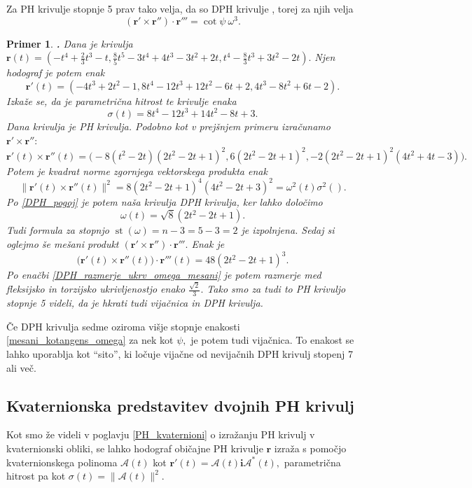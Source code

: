 \documentclass[12pt,a4paper,twoside]{article}
\theoremstyle{definition} %
\theoremstyle{plain} %
\theoremstyle{primerstyle}
\newtheorem{primer}[definicija]{Primer}
\numberwithin{equation}{section}  %
\newcommand{\rV}{\mathbf{r}}
\newcommand{\iV}{\mathbf{i}}
\newcommand{\AQ}{\mathcal{A}}
\DeclareMathOperator{\st}{st}
\begin{document}
Za PH krivulje stopnje 5 prav tako velja, da so DPH krivulje \cite[Izrek 1]{beltranmonterde}, torej za njih velja 
\begin{equation}
	\label{mesani_kotangens_omega}
	(\rV'\times\rV'')\cdot\rV'''=\cot\psi\ \omega^3.
\end{equation}
\begin{primer}
	\textbf{.} Dana je krivulja $\rV(t)=(-t^4+\frac{2}{3}t^3-t,\frac{8}{5}t^5-3t^4+4t^3-3t^2+2t,t^4-\frac{8}{3}t^3+3t^2-2t).$ Njen hodograf je potem enak $$\rV'(t)=(-4t^3+2t^2-1,8t^4-12t^3+12t^2-6 t+2,4t^3-8t^2+6 t-2).$$ Izkaže se, da je parametrična hitrost te krivulje enaka
	$$\sigma(t)=8t^4-12t^3+14t^2-8t+3.$$
	Dana krivulja je PH krivulja. Podobno kot v prejšnjem primeru izračunamo $\rV'\times\rV'':$
	$$\rV'(t)\times\rV''(t)=\big(-8(t^2-2t)(2t^2-2t+1)^2,6(2t^2-2t+1)^2,-2(2t^2-2t+1)^2(4t^2+4t-3)\big).$$
	Potem je kvadrat norme zgornjega vektorskega produkta enak
	$$\lVert\rV'(t)\times\rV''(t)\rVert^2=8(2t^2-2t+1)^4(4t^2-2t+3)^2=\omega^2(t)\sigma^2().$$
	Po \eqref{DPH_pogoj} je potem naša krivulja DPH krivulja, ker lahko določimo $$\omega(t)=\sqrt{8}(2t^2-2t+1).$$ Tudi formula za stopnjo $\st(\omega)=n-3=5-3=2$ je izpolnjena. Sedaj si oglejmo še mešani produkt $(\rV'\times\rV'')\cdot\rV'''.$ Enak je
	$$\big(\rV'(t)\times\rV''(t)\big)\cdot\rV'''(t)=48(2t^2-2t+1)^3.$$
	Po enačbi \eqref{DPH_razmerje_ukrv_omega_mesani} je potem razmerje med fleksijsko in torzijsko ukrivljenostjo enako $\frac{\sqrt{2}}{3}.$ Tako smo za tudi to PH krivuljo stopnje 5 videli, da je hkrati tudi vijačnica in DPH krivulja.
\end{primer}

Če DPH krivulja sedme oziroma višje stopnje enakosti \eqref{mesani_kotangens_omega} za nek kot $\psi,$ je potem tudi vijačnica. To enakost se lahko uporablja kot ``sito'', ki ločuje vijačne od nevijačnih DPH krivulj stopenj 7 ali več.

\subsection{Kvaternionska predstavitev dvojnih PH krivulj}

Kot smo že videli v poglavju \ref{PH_kvaternioni} o izražanju PH krivulj v kvaternionski obliki, se lahko hodograf običajne PH krivulje $\rV$ izraža s pomočjo kvaternionskega polinoma $\AQ(t)$ kot $\rV'(t)=\AQ(t)\iV\AQ^*(t),$ parametrična hitrost pa kot $\sigma(t)=\lVert \AQ(t) \rVert^2.$ 
\end{document}
